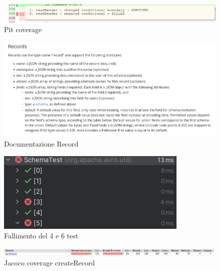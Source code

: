 \documentclass[12pt, a4paper]{article}
\begin{document}
  \begin{figure}
    \includegraphics[width=\linewidth]{./images/file_info/PitCoverageReadHeader3.png}
    \caption{Pit coverage}
    \label{fig:PitCoverageReadHeader3}
  \end{figure}

  \begin{figure}
    \includegraphics[width=\linewidth]{./images/create_record/Documentation.png}
    \caption{Documentazione Record}
    \label{fig:Documentation}
  \end{figure}

  \begin{figure}
    \includegraphics[width=\linewidth]{./images/create_record/TestFailsCreateRecord.png}
    \caption{Fallimento del 4 e 6 test}
    \label{fig:TestFailsCreateRecord}
  \end{figure}

  \begin{figure}
    \includegraphics[width=\linewidth]{./images/create_record/JacocoCoverage1.png}
    \caption{Jacoco coverage createRecord}
    \label{fig:JacocoCoverageCreateRecord1}
  \end{figure}
\end{document}
